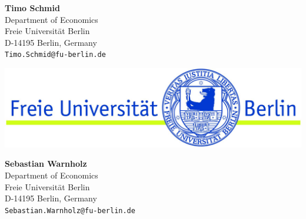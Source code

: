 \documentclass[a0,portrait]{a0poster}\usepackage[]{graphicx}\usepackage[]{color}
\begin{document}

\vfill
\vspace{0.5cm}
\begin{minipage}[b]{0.3\linewidth}
  \Large\textbf{Timo Schmid}\\[0.5cm]
  \large 
  Department of Economics\\
  Freie Universit\"at Berlin\\
  D-14195 Berlin, Germany\\
  \texttt{Timo.Schmid@fu-berlin.de}
\end{minipage}
\hfill
\begin{minipage}[b]{0.3\linewidth}
\includegraphics[width=\linewidth]{FuBerlin}
\end{minipage}
\hfill
\begin{minipage}[b]{0.3\linewidth}
\begin{flushright}
  \Large\textbf{Sebastian Warnholz}\\[0.5cm]
  \large 
  Department of Economics\\
  Freie Universit\"at Berlin\\
  D-14195 Berlin, Germany\\
  \texttt{Sebastian.Warnholz@fu-berlin.de}
\end{flushright}
\end{minipage}
%

\end{document}
